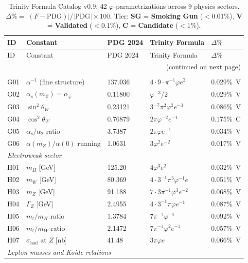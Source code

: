 \documentclass[10pt,a4paper]{article}
\begin{document}
\begin{longtable}{@{}lp{3.0cm}lp{4.5cm}l@{}}
\caption{Trinity Formula Catalog v0.9: 42 $\varphi$-parametrizations across 9 physics sectors.
$\Delta\% = |(F-\text{PDG})|/|\text{PDG}| \times 100$. Tier: \textbf{SG} = \textbf{Smoking Gun} ($<0.01\%$),
\textbf{V} = \textbf{Validated} ($<0.1\%$), \textbf{C} = \textbf{Candidate} ($<1\%$).}
\label{tab:catalog}\\
\toprule
ID & Constant & PDG 2024 & Trinity Formula & $\Delta\%$ \\
\midrule
\endfirsthead
\toprule
ID & Constant & PDG 2024 & Trinity Formula & $\Delta\%$ \\
\midrule
\endhead
\midrule\multicolumn{5}{r}{\small(continued on next page)}\\
\endfoot
\bottomrule
\endlastfoot
\multicolumn{5}{l}{\textit{Gauge / Running coupling sector}}\\
G01 & $\alpha^{-1}$ (fine structure) & 137.036 & $4{\cdot}9{\cdot}\pi^{-1}\varphi e^2$ & 0.029\%~V \\
G02 & $\alpha_s(m_Z) = \alpha_\varphi$ & 0.11800 & $\varphi^{-3}/2$ & 0.029\%~V \\
G03 & $\sin^2\theta_W$ & 0.23121 & $3^{-2}\pi^2\varphi^3 e^{-3}$ & 0.086\%~V \\
G04 & $\cos^2\theta_W$ & 0.76879 & $2\pi\varphi^{-2}e^{-1}$ & 0.175\%~C \\
G05 & $\alpha_s/\alpha_2$ ratio & 3.7387 & $2\pi\varphi e^{-1}$ & 0.034\%~V \\
G06 & $\alpha(m_Z)/\alpha(0)$ running & 1.0631 & $3\varphi^2 e^{-2}$ & 0.017\%~V \\
\midrule
\multicolumn{5}{l}{\textit{Electroweak sector}}\\
H01 & $m_H$ [GeV] & 125.20 & $4\varphi^3 e^2$ & 0.032\%~V \\
H02 & $m_W$ [GeV] & 80.369 & $4{\cdot}3^{-1}\pi^3\varphi^{-1}e$ & 0.051\%~V \\
H03 & $m_Z$ [GeV] & 91.188 & $7{\cdot}3\pi^{-1}\varphi^3 e^{-2}$ & 0.068\%~V \\
H04 & $\Gamma_Z$ [GeV] & 2.4955 & $4{\cdot}3^{-1}\pi\varphi e^{-1}$ & 0.087\%~V \\
H05 & $m_t/m_H$ ratio & 1.3784 & $7\pi^{-1}\varphi^{-1}$ & 0.092\%~V \\
H06 & $m_t/m_W$ ratio & 2.1472 & $7\pi^{-1}\varphi^2 e^{-1}$ & 0.057\%~V \\
H07 & $\sigma_{\mathrm{had}}$ at $Z$ [nb] & 41.48 & $3\pi\varphi e$ & 0.066\%~V \\
\midrule
\multicolumn{5}{l}{\textit{Lepton masses and Koide relations}}\\

\end{longtable}
\end{document}
